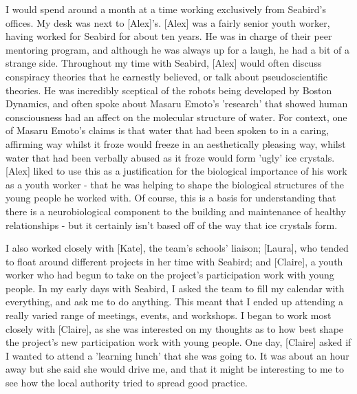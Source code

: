 I would spend around a month at a time working exclusively from Seabird's offices. My desk was next to [Alex]'s. [Alex] was a fairly senior youth worker, having worked for Seabird for about ten years. He was in charge of their peer mentoring program, and although he was always up for a laugh, he had a bit of a strange side. Throughout my time with Seabird, [Alex] would often discuss conspiracy theories that he earnestly believed, or talk about pseudoscientific theories. He was incredibly sceptical of the robots being developed by Boston Dynamics, and often spoke about Masaru Emoto's 'research' that showed human consciousness had an affect on the molecular structure of water. For context, one of Masaru Emoto's claims is that water that had been spoken to in a caring, affirming way whilst it froze would freeze in an aesthetically pleasing way, whilst water that had been verbally abused as it froze would form 'ugly' ice crystals. [Alex] liked to use this as a justification for the biological importance of his work as a youth worker - that he was helping to shape the biological structures of the young people he worked with. Of course, this is a basis for understanding that there is a neurobiological component to the building and maintenance of healthy relationships - but it certainly isn't based off of the way that ice crystals form.

I also worked closely with [Kate], the team's schools' liaison; [Laura], who tended to float around different projects in her time with Seabird; and [Claire], a youth worker who had begun to take on the project's participation work with young people. In my early days with Seabird, I asked the team to fill my calendar with everything, and ask me to do anything. This meant that I ended up attending a really varied range of meetings, events, and workshops. I began to work most closely with [Claire], as she was interested on my thoughts as to how best shape the project's new participation work with young people. One day, [Claire] asked if I wanted to attend a 'learning lunch' that she was going to. It was about an hour away but she said she would drive me, and that it might be interesting to me to see how the local authority tried to spread good practice.  

